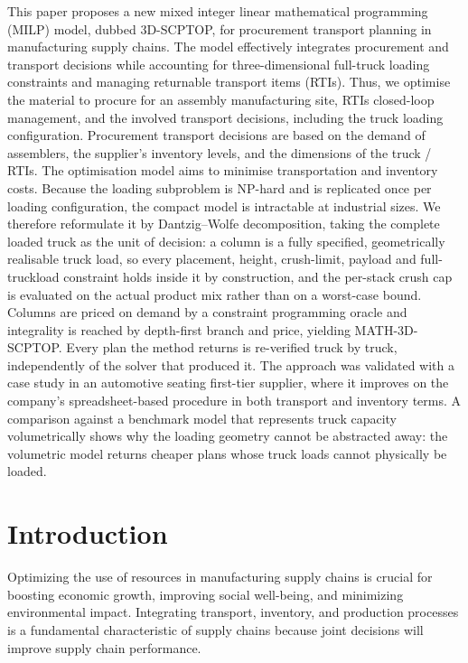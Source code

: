 

{\color{blue}
This paper proposes a new mixed integer linear mathematical programming (MILP) model, dubbed 3D-SCPTOP, for procurement transport planning in manufacturing supply chains. The model effectively integrates procurement and transport decisions while accounting for three-dimensional full-truck loading constraints and managing returnable transport items (RTIs). Thus, we optimise the material to procure for an assembly manufacturing site, RTIs closed-loop management,  and the involved transport decisions, including the truck loading configuration. Procurement transport decisions are based on the demand of assemblers, the supplier's inventory levels, and the dimensions of the truck / RTIs. The optimisation model aims to minimise transportation and inventory costs. Because the loading subproblem is NP-hard and is replicated once per loading configuration, the compact model is intractable at industrial sizes. We therefore reformulate it by Dantzig--Wolfe decomposition, taking the complete loaded truck as the unit of decision: a column is a fully specified, geometrically realisable truck load, so every placement, height, crush-limit, payload and full-truckload constraint holds inside it by construction, and the per-stack crush cap is evaluated on the actual product mix rather than on a worst-case bound. Columns are priced on demand by a constraint programming oracle and integrality is reached by depth-first branch and price, yielding MATH-3D-SCPTOP. Every plan the method returns is re-verified truck by truck, independently of the solver that produced it. The approach was validated with a case study in an automotive seating first-tier supplier, where it improves on the company's spreadsheet-based procedure in both transport and inventory terms. A comparison against a benchmark model that represents truck capacity volumetrically shows why the loading geometry cannot be abstracted away: the volumetric model returns cheaper plans whose truck loads cannot physically be loaded.
}

\section{Introduction}

Optimizing the use of resources in manufacturing supply chains is crucial for boosting economic growth, improving social well-being, and minimizing environmental impact. Integrating transport, inventory, and production processes is a fundamental characteristic of supply chains \autocite{Stadtler2015SupplyPlanning} because joint decisions will improve supply chain performance\autocite{Diaz-Madronero2017ADecisions}.

